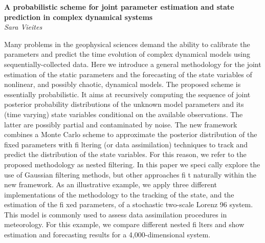 \documentclass[12pt]{article}
\newcommand{\postertitle}[1]{{\Large\bf #1}\\[12pt]}
\newcommand{\authors}[1]{\emph{#1}\\}
\begin{document}
\begin{center}
\vspace*{0.5cm}
%
\postertitle{A probabilistic scheme for joint parameter estimation and state 
prediction in complex dynamical systems}
%
\authors{Sara Vieites} %
% 
\vspace*{0.3cm}
\end{center}

Many problems in the geophysical sciences demand the ability 
to calibrate the parameters and predict the time evolution of complex 
dynamical models using sequentially-collected data. Here we introduce a 
general methodology for the joint estimation of the static parameters 
and the forecasting of the state variables of nonlinear, and possibly 
chaotic, dynamical models. The proposed scheme is essentially 
probabilistic. It aims at recursively computing the sequence of joint 
posterior probability distributions of the unknown model parameters and 
its (time varying) state variables conditional on the available 
observations. The latter are possibly partial and contaminated by noise. 
The new framework combines a Monte Carlo scheme to approximate the 
posterior distribution of the  fixed parameters with fi ltering (or data 
assimilation) techniques to track and predict the distribution of the 
state variables. For this reason, we refer to the proposed methodology 
as nested  filtering. In this paper we speci cally explore the use of 
Gaussian  filtering methods, but other approaches fi t naturally within 
the new framework. As an illustrative example, we apply three different 
implementations of the methodology to the tracking of the state, and the 
estimation of the fi xed parameters, of a stochastic two-scale Lorenz 96 
system. This model is commonly used to assess data assimilation 
procedures in meteorology. For this example, we compare different nested 
fi lters and show estimation and forecasting results for a 
4,000-dimensional system.
\end{document}
